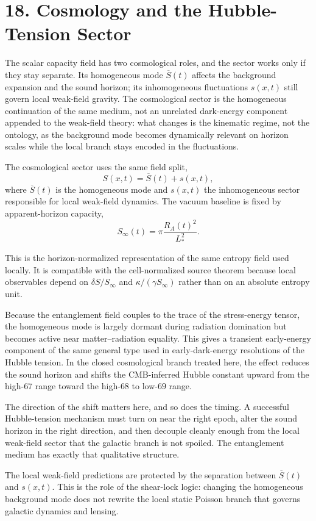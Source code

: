 \documentclass[11pt]{article}
\begin{document}
\section{18. Cosmology and the Hubble-Tension Sector}

The scalar capacity field has two cosmological roles, and the sector works only if they stay separate. Its homogeneous mode $\overline S(t)$ affects the background expansion and the sound horizon; its inhomogeneous fluctuations $s(x,t)$ still govern local weak-field gravity. The cosmological sector is the homogeneous continuation of the same medium, not an unrelated dark-energy component appended to the weak-field theory: what changes is the kinematic regime, not the ontology, as the background mode becomes dynamically relevant on horizon scales while the local branch stays encoded in the fluctuations.

The cosmological sector uses the same field split,
\[
S(x,t)=\overline S(t)+s(x,t),
\]
where $\overline S(t)$ is the homogeneous mode and $s(x,t)$ the inhomogeneous sector responsible for local weak-field dynamics. The vacuum baseline is fixed by apparent-horizon capacity,
\[
S_\infty(t)=\pi\frac{R_A(t)^2}{L_*^2}.
\]

This is the horizon-normalized representation of the same entropy field used locally. It is compatible with the cell-normalized source theorem because local observables depend on $\delta S/S_\infty$ and $\kappa/(\gamma S_\infty)$ rather than on an absolute entropy unit.

Because the entanglement field couples to the trace of the stress-energy tensor, the homogeneous mode is largely dormant during radiation domination but becomes active near matter--radiation equality. This gives a transient early-energy component of the same general type used in early-dark-energy resolutions of the Hubble tension. In the closed cosmological branch treated here, the effect reduces the sound horizon and shifts the CMB-inferred Hubble constant upward from the high-$67$ range toward the high-$68$ to low-$69$ range.

The direction of the shift matters here, and so does the timing. A successful Hubble-tension mechanism must turn on near the right epoch, alter the sound horizon in the right direction, and then decouple cleanly enough from the local weak-field sector that the galactic branch is not spoiled. The entanglement medium has exactly that qualitative structure.

The local weak-field predictions are protected by the separation between $\overline S(t)$ and $s(x,t)$. This is the role of the shear-lock logic: changing the homogeneous background mode does not rewrite the local static Poisson branch that governs galactic dynamics and lensing.
\end{document}
